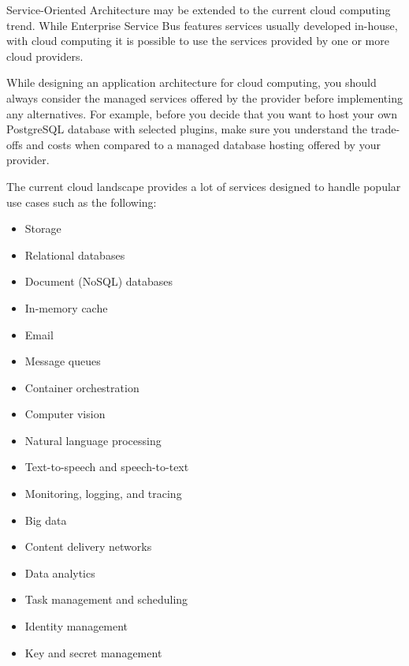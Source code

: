 
Service-Oriented Architecture may be extended to the current cloud computing trend. While Enterprise Service Bus features services usually developed in-house, with cloud computing it is possible to use the services provided by one or more cloud providers.

While designing an application architecture for cloud computing, you should always consider the managed services offered by the provider before implementing any alternatives. For example, before you decide that you want to host your own PostgreSQL database with selected plugins, make sure you understand the trade-offs and costs when compared to a managed database hosting offered by your provider.

The current cloud landscape provides a lot of services designed to handle popular use cases such as the following:

\begin{itemize}
\item 
Storage

\item 
Relational databases

\item 
Document (NoSQL) databases

\item 
In-memory cache

\item 
Email

\item 
Message queues

\item 
Container orchestration

\item 
Computer vision

\item 
Natural language processing

\item 
Text-to-speech and speech-to-text

\item 
Monitoring, logging, and tracing

\item 
Big data

\item 
Content delivery networks

\item 
Data analytics

\item 
Task management and scheduling

\item 
Identity management

\item 
Key and secret management
\end{itemize}

